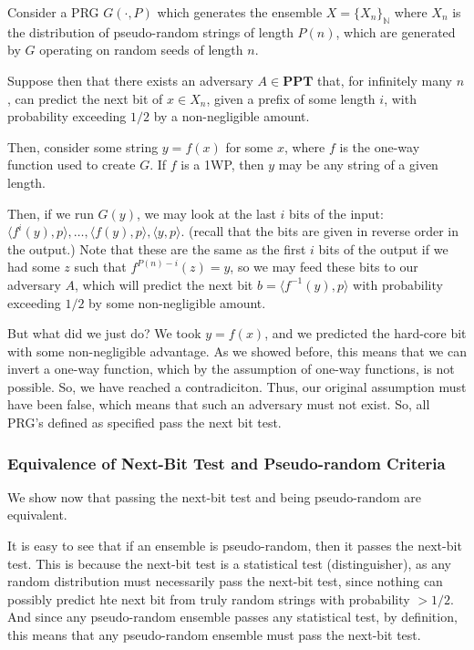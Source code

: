 \documentclass[11pt]{article}
\newcommand{\PPT}{\mathbf{PPT}}
\newcommand{\N}{\mathbb{N}}
\begin{document}
Consider a PRG \(G(\cdot ,P)\) which generates the ensemble \(X=\{X_n\}_\N\) where \(X_n\) is the distribution of pseudo-random strings of length \(P(n)\), which are generated by \(G\) operating on random seeds of length \(n\).

Suppose then that there exists an adversary \(A\in\PPT\) that, for infinitely many \(n\), can predict the next bit of \(x\in X_n\), given a prefix of some length \(i\), with probability exceeding \(1/2\) by a non-negligible amount.\smallskip

Then, consider some string \(y=f(x)\) for some \(x\), where \(f\) is the one-way function used to create \(G\). If \(f\) is a 1WP, then \(y\) may be any string of a given length. 

Then, if we run \(G(y)\), we may look at the last \(i\) bits of the input: \(\langle f^i(y),p\rangle, \ldots, \langle f(y),p\rangle, \langle y,p\rangle\). (recall that the bits are given in reverse order in the output.) Note that these are the same as the first \(i\) bits of the output if we had some \(z\) such that \(f^{P(n)-i}(z)=y\), so we may feed these bits to our adversary \(A\), which will predict the next bit \(b = \langle f^{-1}(y),p\rangle\) with probability exceeding \(1/2\) by some non-negligible amount. \smallskip

But what did we just do? We took \(y=f(x)\), and we predicted the hard-core bit with some non-negligible advantage. As we showed before, this means that we can invert a one-way function, which by the assumption of one-way functions, is not possible. So, we have reached a contradiciton. Thus, our original assumption must have been false, which means that such an adversary must not exist. So, all PRG's defined as specified pass the next bit test.


\subsubsection{Equivalence of Next-Bit Test and Pseudo-random Criteria}
We show now that passing the next-bit test and being pseudo-random are equivalent.\bigskip

It is easy to see that if an ensemble is pseudo-random, then it passes the next-bit test. This is because the next-bit test is a statistical test (distinguisher), as any random distribution must necessarily pass the next-bit test, since nothing can possibly predict hte next bit from truly random strings with probability \(>1/2\). And since any pseudo-random ensemble passes any statistical test, by definition, this means that any pseudo-random ensemble must pass the next-bit test.\bigskip
\end{document}
